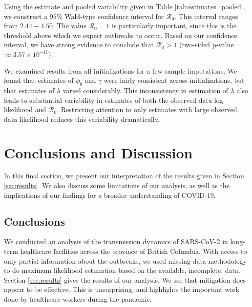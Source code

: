 \documentclass[11pt, oneside]{article}   	%
\newcommand{\RO}{\mathscr{R}_0}	%
\begin{document}
Using the estimate and pooled variability given in Table \ref{tab:estimates_pooled}, we construct a $95\%$ Wald-type confidence interval for $\RO$. This interval ranges from $2.44-4.50$. The value $\RO = 1$ is particularly important, since this is the threshold above which we expect outbreaks to occur. Based on our confidence interval, we have strong evidence to conclude that $\RO > 1$ (two-sided p-value $\approx 3.57 \times 10^{-11}$).

We examined results from all initializations for a few sample imputations. We found that estimates of $\phi_0$ and $\gamma$ were fairly consistent across initializations, but that estimates of $\lambda$ varied considerably. This inconsistency in estimation of $\lambda$ also leads to substantial variability in estimates of both the observed data log-likelihood and $\RO$. Restricting attention to only estimates with large observed data likelihood reduces this variability dramatically.


\section{Conclusions and Discussion}
\label{sec:conc_disc}

In this final section, we present our interpretation of the results given in Section \ref{sec:results}. We also discuss some limitations of our analysis, as well as the implications of our findings for a broader understanding of COVID-19.

\subsection{Conclusions}

We conducted an analysis of the transmission dynamics of SARS-CoV-2 in long-term healthcare facilities across the province of British Columbia. With access to only partial information about the outbreaks, we used missing data methodology to do maximum likelihood estimation based on the available, incomplete, data. Section \ref{sec:results} gives the results of our analysis. We see that mitigation does appear to be effective. This is unsurprising, and highlights the important work done by healthcare workers during the pandemic.
\end{document}
